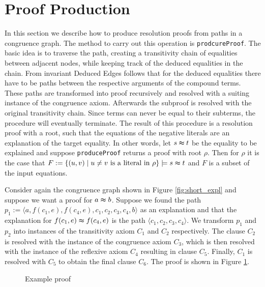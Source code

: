 \section*{Proof Production}
\label{sec:proofproduction}

In this section we describe how to produce resolution proofs from paths in a congruence graph.
The method to carry out this operation is \texttt{prodcureProof}.
The basic idea is to traverse the path, creating a transitivity chain of equalities between adjacent nodes, while keeping track of the deduced equalities in the chain.
From invariant Deduced Edges follows that for the deduced equalities there have to be paths between the respective arguments of the compound terms.
These paths are transformed into proof recursively and resolved with a suiting instance of the congruence axiom.
Afterwards the subproof is resolved with the original transitivity chain.
Since terms can never be equal to their subterms, the procedure will eventually terminate.
The result of this procedure is a resolution proof with a root, such that the equations of the negative literals are an explanation of the target equality.
In other words, let $s \thickapprox t$ be the equality to be explained and suppose \texttt{produceProof} returns a proof with root $\rho$.
Then for $\rho$ it is the case that $F := \{(u,v) \mid u \neq v \text{ is a literal in } \rho\} \models s \thickapprox t$ and $F$ is a subset of the input equations.




\begin{example}

Consider again the congruence graph shown in Figure \ref{fig:short_expl} and suppose we want a proof for $a \thickapprox b$.
Suppose we found the path $p_1 := \langle  a, f(c_1,e), f(c_4,e), c_1, c_2, c_3, c_4, b \rangle$ as an explanation and that the explanation for $f(c_1,e) \thickapprox f(c_4,e)$ is the path $\langle c_1, c_2, c_3, c_4 \rangle$.
We transform $p_1$ and $p_2$ into instances of the transitivity axiom $C_1$ and $C_2$ respectively. 
The clause $C_2$ is resolved with the instance of the congruence axiom $C_3$, which is then resolved with the instance of the reflexive axiom $C_4$ resulting in clause $C_5$.
Finally, $C_1$ is resolved with $C_5$ to obtain the final clause $C_6$.
The proof is shown in Figure \ref{fig:proofprod}.

\begin{figure}[!h]

\caption{Example proof}
\label{fig:proofprod}
\end{figure}

\end{example}

